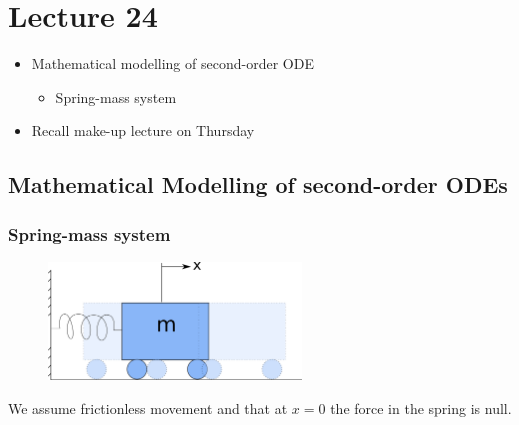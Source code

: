 \chapter*{Lecture 24}
\begin{recall}{}{}
\begin{itemize}
\item Mathematical modelling of second-order ODE
\begin{itemize}
\item Spring-mass system
\end{itemize}
\item Recall make-up lecture on Thursday
\end{itemize}
\end{recall}



\section{Mathematical Modelling of second-order ODEs}

\subsection{Spring-mass system}
\begin{figure}
\centering
\includegraphics[width=0.6\textwidth]{figs/massSpringSystem.png} 
\end{figure}
We assume frictionless movement and that at $x=0$ the force in the spring is null.

